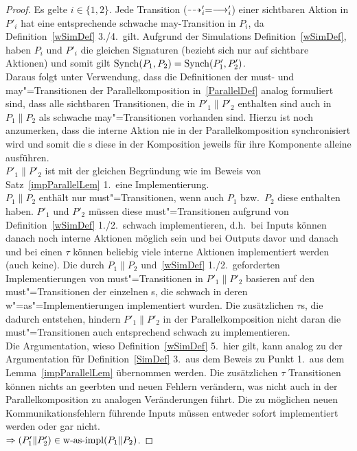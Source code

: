 \begin{proof}\mbox{}
    Es gelte $i\in\{1,2\}$. Jede Transition ($\may '_i =\must '_i$) einer
    sichtbaren Aktion in $P'_i$ hat eine entsprechende schwache
    may-Transition in $P_i$, da Definition~\ref{wSimDef} 3./4.\ gilt. Aufgrund
    der Simulations Definition~\ref{wSimDef}, haben $P_i$ und $P'_i$ die
    gleichen Signaturen (bezieht sich nur auf sichtbare Aktionen) und somit
    gilt $\mathrm{Synch} (P_1,P_2) = \mathrm{Synch} (P'_1,P'_2)$.\\
    Daraus folgt unter Verwendung, dass die Definitionen der must- und
    may"=Transitionen der Parallelkomposition in~\ref{ParallelDef} analog
    formuliert sind, dass alle sichtbaren Transitionen, die in $P'_1\|P'_2$
    enthalten sind auch in $P_1\|P_2$ als schwache may"=Transitionen
    vorhanden sind. Hierzu ist noch anzumerken, dass die interne Aktion nie
    in der Parallelkomposition synchronisiert wird und somit die \MEIO{}s
    diese in der Komposition jeweils für ihre Komponente alleine ausführen.\\
    $P'_1\|P'_2$ ist mit der gleichen Begründung wie im Beweis von
    Satz~\ref{impParallelLem} 1.\ eine Implementierung.\\
    $P_1\|P_2$ enthält nur must"=Transitionen, wenn auch $P_1$ bzw.\ $P_2$
    diese enthalten haben. $P'_1$ und $P'_2$ müssen diese must"=Transitionen
    aufgrund von Definition~\ref{wSimDef} 1./2.\ schwach implementieren, d.h.\
    bei Inputs können danach noch interne Aktionen möglich sein und bei
    Outputs davor und danach und bei einen $\tau$ können beliebig viele
    interne Aktionen implementiert werden (auch keine). Die durch $P_1\|P_2$
    und~\ref{wSimDef} 1./2.\ geforderten Implementierungen von must"=Transitionen
    in $P'_1\|P'_2$ basieren auf den must"=Transitionen der einzelnen
    \MEIO{}s, die schwach in deren w"=as"=Implementierungen implementiert
    wurden. Die zusätzlichen $\tau$s, die dadurch entstehen, hindern
    $P'_1\|P'_2$ in der Parallelkomposition nicht daran die
    must"=Transitionen auch entsprechend schwach zu implementieren.\\
    Die Argumentation, wieso Definition~\ref{wSimDef} 5.\ hier gilt, kann
    analog zu der Argumentation für Definition~\ref{SimDef} 3.\ aus dem
    Beweis zu Punkt 1.\ aus dem Lemma~\ref{impParallelLem} übernommen werden.
    Die zusätzlichen $\tau$ Transitionen können nichts an geerbten und neuen
    Fehlern verändern, was nicht auch in der
    Parallelkomposition zu analogen Veränderungen führt. Die zu möglichen
    neuen Kommunikationsfehlern führende Inputs müssen entweder sofort
    implementiert werden oder gar nicht.\\
    $\Rightarrow (P'_1\|P'_2)\in\mathrm{w}\text{-}\mathrm{as}\text{-}\mathrm{impl} (P_1\|P_2)$.
\end{proof}

